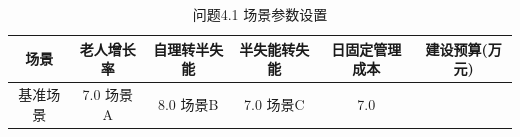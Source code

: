 \begin{table}[htbp]
\centering
\caption{问题4.1 场景参数设置}
\begin{tabular}{|c|c|c|c|c|c|}
\hline
场景 & 老人增长率 & 自理转半失能 & 半失能转失能 & 日固定管理成本 & 建设预算(万元) \\
\hline
基准场景 & 7.0%
场景A & 8.0%
场景B & 7.0%
场景C & 7.0%
\hline
\end{tabular}
\end{table}
